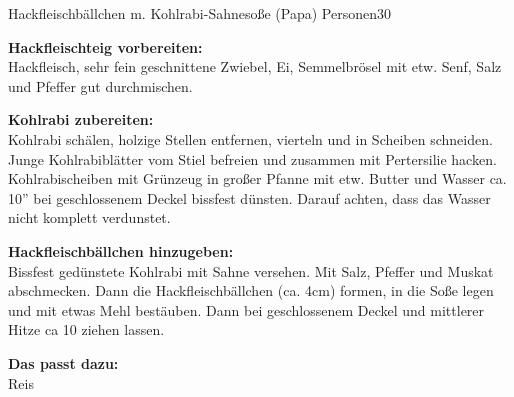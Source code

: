 \begin{MyRecipe}{Hackfleischbällchen m. Kohlrabi-Sahnesoße (Papa)}{ Personen}{\SI{30}{\minuteprime}}
	
	
	\textbf{Hackfleischteig vorbereiten:}\\
	Hackfleisch, sehr fein geschnittene Zwiebel, Ei, Semmelbrösel mit etw. Senf, Salz und Pfeffer gut durchmischen.\par\bigskip
	

	\textbf{Kohlrabi zubereiten:}\\
	Kohlrabi schälen, holzige Stellen entfernen, vierteln und in Scheiben schneiden. Junge Kohlrabiblätter vom Stiel befreien und zusammen mit Pertersilie hacken. Kohlrabischeiben mit Grünzeug in großer Pfanne mit etw. Butter und Wasser ca. 10'' bei geschlossenem Deckel bissfest dünsten. Darauf achten, dass das Wasser nicht komplett verdunstet.\par\bigskip
	
	
	\textbf{Hackfleischbällchen hinzugeben:}\\
	Bissfest gedünstete Kohlrabi mit Sahne versehen. Mit Salz, Pfeffer und Muskat abschmecken. Dann die Hackfleischbällchen (ca. 4cm) formen, in die Soße legen und mit etwas Mehl bestäuben. Dann bei geschlossenem Deckel und mittlerer Hitze ca \SI{10}{\minuteprime} ziehen lassen.\par\bigskip
	
	\textbf{Das passt dazu:}\\
	Reis
	
\end{MyRecipe}